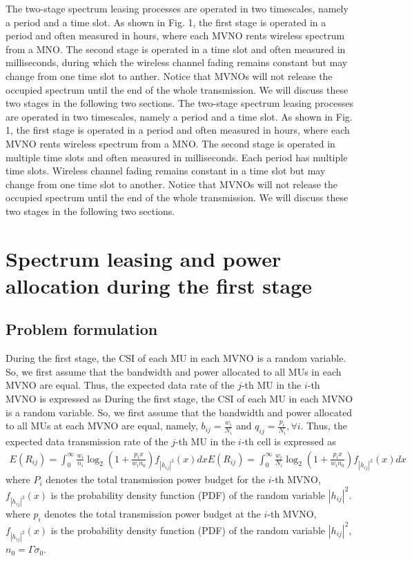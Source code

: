 \documentclass[journal]{IEEEtran}
\begin{document}
\begin{IEEEkeywords}
The two-stage spectrum leasing processes are operated in two timescales, namely a period and a time slot. As shown in Fig. 1, the first stage is operated in a period and often measured in hours, where each MVNO rents wireless spectrum from a MNO. The second stage is operated in a time slot and often measured in milliseconds, during which the  wireless channel fading remains constant but may change from one time slot to anther. Notice that MVNOs will not release the occupied spectrum until the end of the whole transmission. We will discuss these two stages in the following two sections.
The two-stage spectrum leasing processes are operated in two timescales, namely a period and a time slot. As shown in Fig. 1, the first stage is operated in a period and often measured in hours, where each MVNO rents wireless spectrum from a MNO. The second stage is operated in multiple time slots and often measured in milliseconds. Each period has multiple time slots. Wireless channel fading remains constant in a time slot but may change from one time slot to another. Notice that MVNOs will not release the occupied spectrum until the end of the whole transmission. We will discuss these two stages in the following two sections.

\section{Spectrum leasing and power allocation during the first stage}

\subsection{Problem formulation}
During the first stage, the CSI of each MU in each MVNO is a random variable. So, we first assume that the bandwidth and power allocated to all MUs in each MVNO are equal. Thus, the expected data rate of the $j$-th MU in the $i$-th MVNO is expressed as
During the first stage, the CSI of each MU in each MVNO is a random variable. So, we first assume that the bandwidth and power allocated to all MUs at each MVNO are equal, namely, $b_{ij} = \frac{w_i}{N_i}$ and $q_{ij} = \frac{p_i}{N_i}, \forall i$. Thus, the expected data transmission rate of the $j$-th MU in the $i$-th cell is expressed as
\begin{align}
E\left({R}_{ij}\right) = \int_{0}^{\infty} \frac{w_i}{n_i} \log_2\left(1 + \frac{p_i x}{w_i n_0}\right) f_{\left|h_{ij} \right|^2} \left(x\right)dx
E\left({R}_{ij}\right) = \int_{0}^{\infty} \frac{w_i}{N_i} \log_2\left(1 + \frac{p_i x}{w_i n_0}\right) f_{\left|h_{ij} \right|^2} \left(x\right)dx
\end{align}
where $P_i$ denotes the total transmission power budget for the $i$-th MVNO, $f_{\left|h_{ij} \right|^2} \left(x\right)$ is the probability density function (PDF) of the random variable $\left|h_{ij} \right|^2$. 
where $p_i$ denotes the total transmission power budget at the $i$-th MVNO, $f_{\left|h_{ij} \right|^2} \left(x\right)$ is the probability density function (PDF) of the random variable $\left|h_{ij} \right|^2$, $n_0 = \Gamma \sigma_0$. 


\end{IEEEkeywords}
\end{document}
